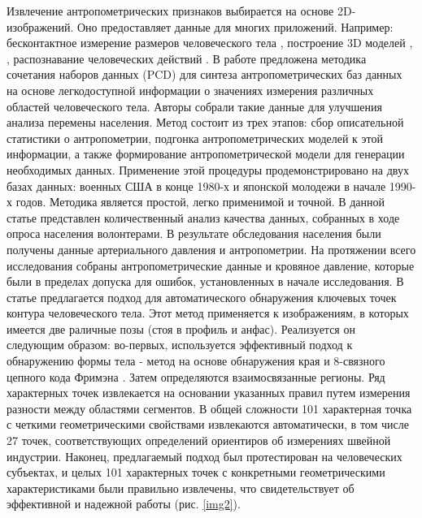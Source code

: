Извлечение антропометрических признаков выбирается на основе 2D-изображений. Оно предоставляет данные для многих приложений. Например: бесконтактное измерение размеров человеческого тела \cite{Lin2008}, построение 3D моделей \cite{Lin2010}, \cite{Lin2012}, распознавание человеческих действий \cite{Ikizler2008}. 
В работе \cite{Gopal} предложена методика сочетания наборов данных (PCD) для синтеза антропометрических баз данных на основе легкодоступной информации о значениях измерения различных областей человеческого тела. Авторы собрали такие данные для улучшения анализа перемены населения. Метод состоит из трех этапов: сбор описательной статистики о антропометрии, подгонка антропометрических моделей к этой информации, а также формирование антропометрической модели для генерации необходимых данных. Применение этой процедуры продемонстрировано на двух базах данных: военных США в конце 1980-х и японской молодежи в начале 1990-х годов. Методика является простой, легко применимой и точной. В данной статье \cite{Adams} представлен количественный анализ качества данных, собранных в ходе опроса населения волонтерами.  В результате обследования населения были получены данные артериального давления и антропометрии. На протяжении всего исследования собраны антропометрические данные и кровяное давление, которые были в пределах допуска для ошибок, установленных в начале исследования. В статье \cite{Jiang2012} предлагается подход для автоматического обнаружения ключевых точек контура человеческого тела. Этот метод применяется к изображениям, в которых имеется две раличные  позы (стоя в профиль и анфас). Реализуется он следующим образом: во-первых, используется эффективный подход к обнаружению формы тела - метод на основе обнаружения края \cite{Canny1986} и 8-связного цепного кода Фримэна \cite{Freeman1961}. Затем определяются взаимосвязанные регионы. Ряд характерных точек извлекается на основании указанных правил путем измерения разности между областями сегментов. В общей сложности 101 характерная точка с четкими геометрическими свойствами извлекаются автоматически, в том числе 27 точек, соответствующих определений ориентиров об измерениях швейной индустрии. Наконец, предлагаемый подход был протестирован на человеческих субъектах, и целых 101 характерных точек с конкретными геометрическими характеристиками были правильно извлечены, что свидетельствует об эффективной и надежной работы (рис. \ref{img2}).

